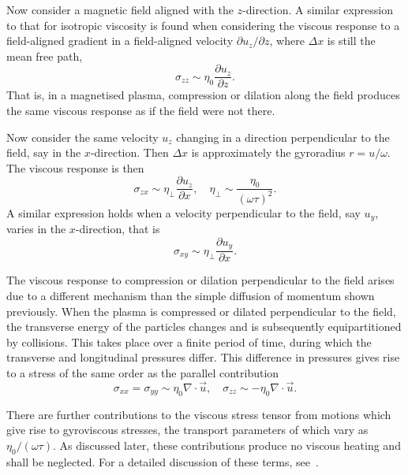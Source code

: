 Now consider a magnetic field aligned with the $z$-direction. A similar expression to that for isotropic viscosity is found when considering the viscous response to a field-aligned gradient in a field-aligned velocity $\partial u_z / \partial z$, where $\Delta x$ is still the mean free path,
\begin{equation}
  \label{eq:parallel_eta_estimate}
\sigma_{zz} \sim \eta_0 \frac{\partial u_z}{\partial z}.
\end{equation}
That is, in a magnetised plasma, compression or dilation along the field produces the same viscous response as if the field were not there.

Now consider the same velocity $u_z$ changing in a direction perpendicular to the field, say in the $x$-direction. Then $\Delta x$ is approximately the gyroradius $r = u/\omega$. The viscous response is then
\begin{equation}
  \label{eq:perp_eta_estimate}
\sigma_{zx} \sim \eta_{\perp} \frac{\partial u_z}{\partial x}, \quad \eta_{\perp} \sim \frac{\eta_0}{(\omega \tau)^2}.
\end{equation}
A similar expression holds when a velocity perpendicular to the field, say $u_y$, varies in the $x$-direction, that is
\begin{equation}
  \label{eq:perp_eta_estimate2}
\sigma_{xy} \sim \eta_{\perp} \frac{\partial u_y}{\partial x}.
\end{equation}

The viscous response to compression or dilation perpendicular to the field arises due to a different mechanism than the simple diffusion of momentum shown previously. When the plasma is compressed or dilated perpendicular to the field, the transverse energy of the particles changes and is subsequently equipartitioned by collisions. This takes place over a finite period of time, during which the transverse and longitudinal pressures differ. This difference in pressures gives rise to a stress of the same order as the parallel contribution
\begin{equation}
  \label{eq:compression_eta_estimate}
\sigma_{xx} = \sigma_{yy} \sim \eta_0 \nabla \cdot \vec{u}, \quad \sigma_{zz} \sim - \eta_0 \nabla \cdot \vec{u}.
\end{equation}

There are further contributions to the viscous stress tensor from motions which give rise to gyroviscous stresses, the transport parameters of which vary as $\eta_0 / (\omega \tau)$. As discussed later, these contributions produce no viscous heating and shall be neglected. For a detailed discussion of these terms, see~\cite{kaufmanPlasmaViscosityMagnetic1960}.

